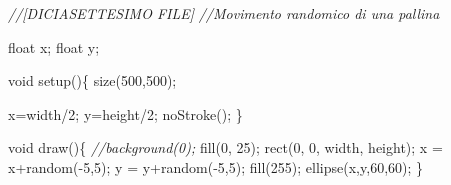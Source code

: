 \documentclass[
]{article}
\newenvironment{Shaded}{}{}
\newcommand{\CommentTok}[1]{\textcolor[rgb]{0.38,0.63,0.69}{\textit{#1}}}
\newcommand{\DataTypeTok}[1]{\textcolor[rgb]{0.56,0.13,0.00}{#1}}
\newcommand{\DecValTok}[1]{\textcolor[rgb]{0.25,0.63,0.44}{#1}}
\newcommand{\FunctionTok}[1]{\textcolor[rgb]{0.02,0.16,0.49}{#1}}
\newcommand{\NormalTok}[1]{#1}
\newcommand{\OperatorTok}[1]{\textcolor[rgb]{0.40,0.40,0.40}{#1}}
\begin{document}
\begin{Shaded}
\begin{Highlighting}[]
\CommentTok{//[DICIASETTESIMO FILE]}
 \CommentTok{//Movimento randomico di una pallina}

\DataTypeTok{float}\NormalTok{ x}\OperatorTok{;}
\DataTypeTok{float}\NormalTok{ y}\OperatorTok{;}

\DataTypeTok{void} \FunctionTok{setup}\OperatorTok{()\{}
    \FunctionTok{size}\OperatorTok{(}\DecValTok{500}\OperatorTok{,}\DecValTok{500}\OperatorTok{);}

\NormalTok{    x}\OperatorTok{=}\NormalTok{width}\OperatorTok{/}\DecValTok{2}\OperatorTok{;}
\NormalTok{    y}\OperatorTok{=}\NormalTok{height}\OperatorTok{/}\DecValTok{2}\OperatorTok{;}
    \FunctionTok{noStroke}\OperatorTok{();}
\OperatorTok{\}}

\DataTypeTok{void} \FunctionTok{draw}\OperatorTok{()\{}
    \CommentTok{//background(0);}
    \FunctionTok{fill}\OperatorTok{(}\DecValTok{0}\OperatorTok{,} \DecValTok{25}\OperatorTok{);}
    \FunctionTok{rect}\OperatorTok{(}\DecValTok{0}\OperatorTok{,} \DecValTok{0}\OperatorTok{,}\NormalTok{ width}\OperatorTok{,}\NormalTok{ height}\OperatorTok{);}
\NormalTok{    x }\OperatorTok{=}\NormalTok{ x}\OperatorTok{+}\FunctionTok{random}\OperatorTok{({-}}\DecValTok{5}\OperatorTok{,}\DecValTok{5}\OperatorTok{);}
\NormalTok{    y }\OperatorTok{=}\NormalTok{ y}\OperatorTok{+}\FunctionTok{random}\OperatorTok{({-}}\DecValTok{5}\OperatorTok{,}\DecValTok{5}\OperatorTok{);}
    \FunctionTok{fill}\OperatorTok{(}\DecValTok{255}\OperatorTok{);}
    \FunctionTok{ellipse}\OperatorTok{(}\NormalTok{x}\OperatorTok{,}\NormalTok{y}\OperatorTok{,}\DecValTok{60}\OperatorTok{,}\DecValTok{60}\OperatorTok{);}
\OperatorTok{\}}
\end{Highlighting}
\end{Shaded}
\end{document}
